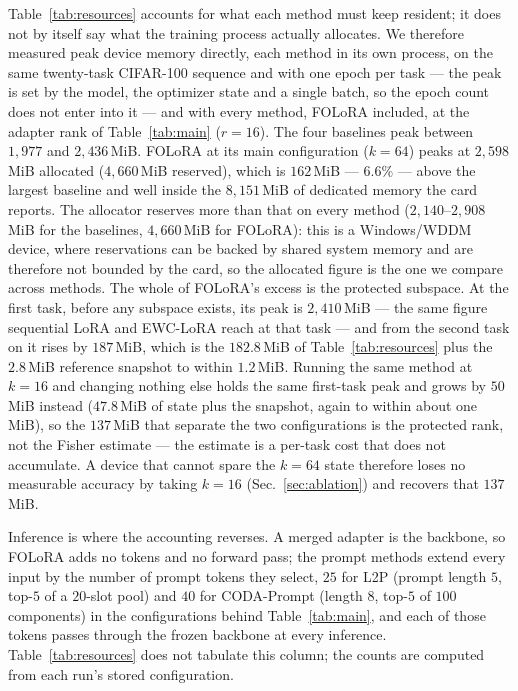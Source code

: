 Table~\ref{tab:resources} accounts for what each method must keep resident; it does not by
itself say what the training process actually allocates. We therefore measured peak device
memory directly, each method in its own process, on the same twenty-task CIFAR-100 sequence
and with one epoch per task --- the peak is set by the model, the optimizer state and a
single batch, so the epoch count does not enter into it --- and with every method, FOLoRA
included, at the adapter rank of Table~\ref{tab:main} ($r{=}16$). The four baselines peak
between $1{,}977$ and $2{,}436$\,MiB. FOLoRA at its main configuration ($k{=}64$) peaks at
$2{,}598$\,MiB allocated ($4{,}660$\,MiB reserved), which is $162$\,MiB --- $6.6\%$ --- above
the largest baseline and well inside the $8{,}151$\,MiB of dedicated memory the card reports.
The allocator reserves more than that on every method ($2{,}140$--$2{,}908$\,MiB for the
baselines, $4{,}660$\,MiB for FOLoRA): this is a Windows/WDDM device, where reservations can
be backed by shared system memory and are therefore not bounded by the card, so the allocated
figure is the one we compare across methods.
The whole of FOLoRA's excess is the protected subspace. At the first task, before any
subspace exists, its peak is $2{,}410$\,MiB --- the same figure sequential LoRA and EWC-LoRA
reach at that task --- and from the second task on it rises by $187$\,MiB, which is the
$182.8$\,MiB of Table~\ref{tab:resources} plus the $2.8$\,MiB reference snapshot to within
$1.2$\,MiB. Running the same method at $k{=}16$ and changing nothing else holds the same
first-task peak and grows by $50$\,MiB instead ($47.8$\,MiB of state plus the snapshot, again to
within about one MiB), so the $137$\,MiB that separate
the two configurations is the protected rank, not the Fisher estimate --- the estimate is a
per-task cost that does not accumulate. A device that cannot spare the $k{=}64$ state
therefore loses no measurable accuracy by taking $k{=}16$ (Sec.~\ref{sec:ablation}) and
recovers that $137$\,MiB.

Inference is where the accounting reverses. A merged adapter is the backbone, so FOLoRA
adds no tokens and no forward pass; the prompt methods extend every input by the number of
prompt tokens they select, $25$ for L2P (prompt length $5$, top-$5$ of a $20$-slot pool) and
$40$ for CODA-Prompt (length $8$, top-$5$ of $100$ components) in the configurations behind
Table~\ref{tab:main}, and each of those tokens passes through the frozen backbone at every
inference. Table~\ref{tab:resources} does not tabulate this column; the counts are computed
from each run's stored configuration.

